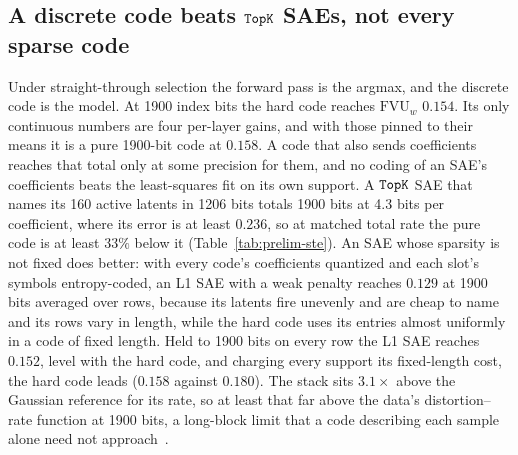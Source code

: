 \subsection{A discrete code beats $\mathop{\mathtt{TopK}}\limits$ SAEs, not every sparse code}
\label{sec:prelim-ste}
Under straight-through selection the forward pass is the argmax, and the
discrete code is the model. At 1900 index bits the hard code reaches
$\mathrm{FVU}_w$ $0.154$. Its only continuous numbers are four
per-layer gains, and with those pinned to their means it is a pure
1900-bit code at $0.158$. A code that also sends coefficients reaches
that total only at some precision for them, and no coding of an SAE's
coefficients beats the least-squares fit on its own support. A $\mathop{\mathtt{TopK}}\limits$
SAE that names its 160 active latents in 1206 bits totals 1900 bits at
4.3 bits per coefficient, where its error is at least $0.236$, so at
matched total rate the pure code is at least $33\%$ below it
(Table~\ref{tab:prelim-ste}). An SAE whose sparsity is not fixed does
better: with every code's coefficients quantized and each slot's symbols
entropy-coded, an L1 SAE with a weak penalty reaches $0.129$ at 1900
bits averaged over rows, because its latents fire unevenly and are cheap
to name and its rows vary in length, while the hard code uses its
entries almost uniformly in a code of fixed length. Held to 1900 bits on
every row the L1 SAE reaches $0.152$, level with the hard code, and
charging every support its fixed-length cost, the hard code leads
($0.158$ against $0.180$). The stack sits $3.1\times$
above the Gaussian reference for its rate, so at least that far above
the data's distortion--rate function at 1900 bits, a long-block limit
that a code describing each sample alone need not
approach~\cite{cover2006}.

